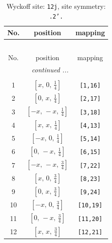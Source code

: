 \documentclass[fleqn,8pt]{jsarticle}
\begin{document}
\begin{longtable}{ccc}
\caption{Wyckoff site: {\tt 12j}, site symmetry: {\tt .2'.}}
 \\
 \hline \hline
No. & position & mapping \\ \hline \endfirsthead

\multicolumn{2}{l}{\tablename\ \thetable{}} \\
 \hline \hline
No. & position & mapping \\ \hline \endhead

 \hline \hline
\multicolumn{2}{r}{\footnotesize\it continued ...} \\ \endfoot

 \hline \hline
\multicolumn{2}{r}{} \\ \endlastfoot

1 & $\left[ x,\, 0,\, \frac{1}{4} \right]$ & {\tt [1,16]} \\ \hline
2 & $\left[ 0,\, x,\, \frac{1}{4} \right]$ & {\tt [2,17]} \\ \hline
3 & $\left[ - x,\, - x,\, \frac{1}{4} \right]$ & {\tt [3,18]} \\ \hline
4 & $\left[ x,\, x,\, \frac{1}{4} \right]$ & {\tt [4,13]} \\ \hline
5 & $\left[ - x,\, 0,\, \frac{1}{4} \right]$ & {\tt [5,14]} \\ \hline
6 & $\left[ 0,\, - x,\, \frac{1}{4} \right]$ & {\tt [6,15]} \\ \hline
7 & $\left[ - x,\, - x,\, \frac{3}{4} \right]$ & {\tt [7,22]} \\ \hline
8 & $\left[ x,\, 0,\, \frac{3}{4} \right]$ & {\tt [8,23]} \\ \hline
9 & $\left[ 0,\, x,\, \frac{3}{4} \right]$ & {\tt [9,24]} \\ \hline
10 & $\left[ - x,\, 0,\, \frac{3}{4} \right]$ & {\tt [10,19]} \\ \hline
11 & $\left[ 0,\, - x,\, \frac{3}{4} \right]$ & {\tt [11,20]} \\ \hline
12 & $\left[ x,\, x,\, \frac{3}{4} \right]$ & {\tt [12,21]} \\
\end{longtable}
\renewcommand{\arraystretch}{1.2}
\end{document}

